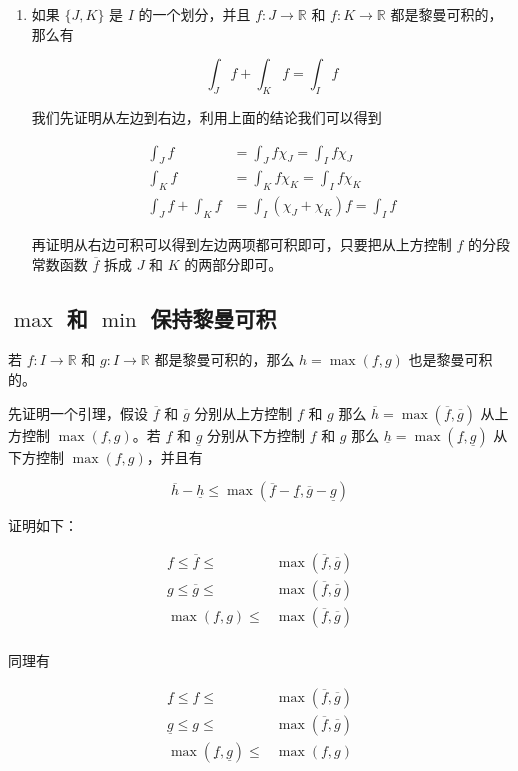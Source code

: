 \begin{enumerate}
    \item 如果 $\{ J, K \} $ 是 $I$ 的一个划分，并且 $f: J \to \mathbb{R}$ 和 $f: K \to \mathbb{R}$ 都是黎曼可积的，那么有

    \[
        \int_{J}f + \int_{K}f = \int_{I}f
    \]

    我们先证明从左边到右边，利用上面的结论我们可以得到

    \begin{align*}
    \int_{J}f &= \int_{J}f \chi_{J} = \int_{I}f \chi_{J} \\
    \int_{K}f &= \int_{K}f \chi_{K} = \int_{I}f \chi_{K} \\
    \int_{J}f + \int_{K} f &= \int_{I}(\chi_{J} + \chi_{K})f  = \int_{I}f
    \end{align*}

    再证明从右边可积可以得到左边两项都可积即可，只要把从上方控制 $f$ 的分段常数函数
    $\overline{f}$ 拆成 $J$ 和 $K$ 的两部分即可。

\end{enumerate}

\subsection{$\max$ 和 $\min$ 保持黎曼可积}

若 $f: I \to \mathbb{R}$ 和 $g: I \to \mathbb{R}$ 都是黎曼可积的，那么 $h=\max(f,g)$ 也是黎曼可积的。

先证明一个引理，假设 $\overline{f}$ 和 $\overline{g}$ 分别从上方控制 $f$ 和 $g$ 那么 $\overline{h} = \max(\overline{f},\overline{g})$
从上方控制 $\max(f,g)$。若 $\underline{f}$ 和 $\underline{g}$ 分别从下方控制 $f$ 和 $g$ 那么
$\underline{h} = \max(\underline{f}, \underline{g})$ 从下方控制 $\max(f,g)$，并且有

\[
\overline{h} - \underline{h} \le \max(\overline{f} - \underline{f}, \overline{g} - \underline{g})
\]

证明如下：

\begin{align*}
    f \le \overline{f} \le & \max(\overline{f}, \overline{g}) \\
    g \le \overline{g} \le & \max(\overline{f}, \overline{g}) \\
    \max(f,g)\le & \max(\overline{f}, \overline{g}) \\
\end{align*}

同理有


\begin{align*}
    \underline{f} \le f \le & \max(\overline{f}, \overline{g}) \\
    \underline{g} \le g \le & \max(\overline{f}, \overline{g}) \\
    \max(\underline{f},\underline{g})\le & \max(f, g) \\
\end{align*}

